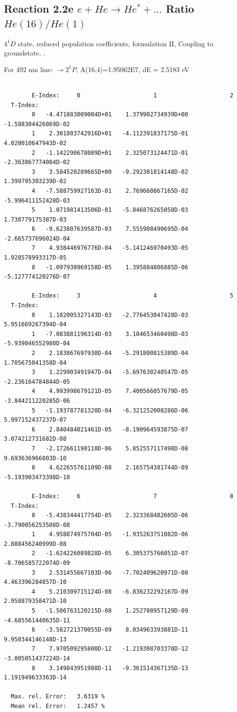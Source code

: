 \documentclass[12pt,dvips]{article}
\begin{document}
\subsection{
  Reaction 2.2e $e + He \rightarrow He^* + ... $ Ratio $He(16)/He(1)$
}

  $4^1D$ state,
  reduced population coefficients, formulation II,
  Coupling to groundstate, \cite{kn:Fujimoto} .

  For 492 nm line: $\rightarrow 2^1P$, A(16,4)=1.95062E7, dE = 2.5183 eV

\begin{small}\begin{verbatim}

        E-Index:     0                     1                     2
  T-Index:
        0   -4.471883009004D+01    1.379902734939D+00   -1.588304426869D-02
        1    2.301803742916D+01   -4.112391837175D-01    4.020010647943D-02
        2   -1.142290678089D+01    2.325073124471D-01   -2.363867774084D-02
        3    3.584520289665D+00   -9.292301814148D-02    1.399795303239D-02
        4   -7.588759927163D-01    2.769660867165D-02   -5.996411152428D-03
        5    1.071981413506D-01   -5.846876265058D-03    1.730779175387D-03
        6   -9.623807639587D-03    7.555908490695D-04   -2.665737696024D-04
        7    4.938446976776D-04   -5.141246970493D-05    1.928578993317D-05
        8   -1.097930969158D-05    1.395884806885D-06   -5.127774120276D-07

        E-Index:     3                     4                     5
  T-Index:
        0    1.102005327143D-03   -2.776453047428D-03    5.951669267394D-04
        1   -7.083881196314D-03    3.184653460498D-03   -5.939046552980D-04
        2    2.183867697930D-04   -5.291800815389D-04    1.705675041358D-04
        3    1.229903491947D-04   -5.697630240547D-05   -2.236164784844D-05
        4    4.993998679121D-05    7.400566057679D-05   -3.844211220285D-06
        5   -1.193787781320D-04   -6.321252008286D-06    5.997152437237D-07
        6    2.840484021461D-05   -8.190964593875D-07    3.074212731682D-08
        7   -2.172661190110D-06    5.852557117498D-08    9.693636966803D-10
        8    4.622655761109D-08    2.165754381744D-09   -5.193903473398D-10

        E-Index:     6                     7                     8
  T-Index:
        0   -5.438344417754D-05    2.323368482605D-06   -3.790056253508D-08
        1    4.958874975704D-05   -1.935263751082D-06    2.888456240999D-08
        2   -1.624226089828D-05    6.305375766051D-07   -8.706585722074D-09
        3    2.531455667103D-06   -7.702409620971D-08    4.463396284857D-10
        4    5.210309715124D-08   -6.836232292167D-09    2.958879358471D-10
        5   -1.506763120215D-08    1.252708957129D-09   -4.685561440635D-11
        6   -3.582721370055D-09    8.034963393881D-11    9.950344146148D-13
        7    7.970509295800D-12   -1.219308703370D-12   -3.005051437224D-14
        8    3.149843951988D-11   -9.361514367135D-13    1.191949633363D-14

  Max. rel. Error:   3.6319 %
  Mean rel. Error:   1.2457 %



\end{verbatim}\end{small}
\end{document}
